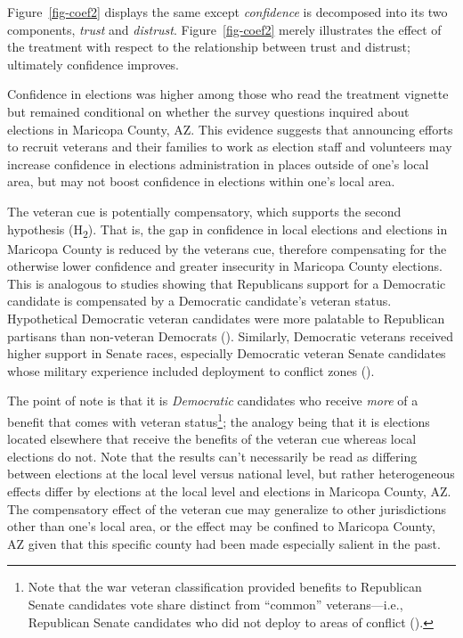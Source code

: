 \documentclass[
  12pt,
  letterpaper,
]{article}
\begin{document}
Figure~\ref{fig-coef2} displays the same except \emph{confidence} is
decomposed into its two components, \emph{trust} and \emph{distrust}.
Figure~\ref{fig-coef2} merely illustrates the effect of the treatment
with respect to the relationship between trust and distrust; ultimately
confidence improves.

Confidence in elections was higher among those who read the treatment
vignette but remained conditional on whether the survey questions
inquired about elections in Maricopa County, AZ. This evidence suggests
that announcing efforts to recruit veterans and their families to work
as election staff and volunteers may increase confidence in elections
administration in places outside of one's local area, but may not boost
confidence in elections within one's local area.

The veteran cue is potentially compensatory, which supports the second
hypothesis (H\textsubscript{2}). That is, the gap in confidence in local
elections and elections in Maricopa County is reduced by the veterans
cue, therefore compensating for the otherwise lower confidence and
greater insecurity in Maricopa County elections. This is analogous to
studies showing that Republicans support for a Democratic candidate is
compensated by a Democratic candidate's veteran status. Hypothetical
Democratic veteran candidates were more palatable to Republican
partisans than non-veteran Democrats
().
Similarly, Democratic veterans received higher support in Senate races,
especially Democratic veteran Senate candidates whose military
experience included deployment to conflict zones
().

The point of note is that it is \emph{Democratic} candidates who receive
\emph{more} of a benefit that comes with veteran status\footnote{Note
  that the war veteran classification provided benefits to Republican
  Senate candidates vote share distinct from ``common'' veterans---i.e.,
  Republican Senate candidates who did not deploy to areas of conflict
  ().}; the analogy being
that it is elections located elsewhere that receive the benefits of the
veteran cue whereas local elections do not. Note that the results can't
necessarily be read as differing between elections at the local level
versus national level, but rather heterogeneous effects differ by
elections at the local level and elections in Maricopa County, AZ. The
compensatory effect of the veteran cue may generalize to other
jurisdictions other than one's local area, or the effect may be confined
to Maricopa County, AZ given that this specific county had been made
especially salient in the past.
\end{document}
